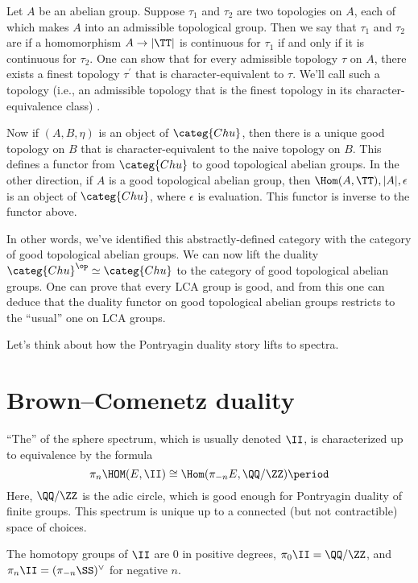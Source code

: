 \documentclass[leqno]{article}
\begin{document}
Let \(A\) be an abelian group.
Suppose \(\tau_{1}\) and \(\tau_{2}\) are two topologies on \(A\),
each of which makes \(A\) into an admissible topological group.
Then we say that \(\tau_{1}\) and \(\tau_{2}\) are  if
a homomorphism \(A \to |\TT|\) is continuous for \(\tau_{1}\)
if and only if it is continuous for \(\tau_{2}\).
One can show that for every admissible topology \(\tau\) on \(A\),
there exists a finest topology \(\tau^{'}\)
that is character-equivalent to \(\tau\).
We'll call such a topology (i.e., an admissible topology that
is the finest topology in its character-equivalence class)
.

Now if \((A,B,\eta)\) is an object of \(\categ{Chu}\), then
there is a unique good topology on \(B\) that is character-equivalent
to the naive topology on \(B\).
This defines a functor from \(\categ{Chu}\)
to good topological abelian groups.
In the other direction, if \(A\) is a good topological abelian group,
then \(\Hom(A,\TT),|A|,\epsilon\) is an object of \(\categ{Chu}\),
where \(\epsilon\) is evaluation.
This functor is inverse to the functor above.

In other words, we've identified this abstractly-defined category
with the category of good topological abelian groups.
We can now lift the duality \(\categ{Chu}^{\op} \simeq \categ{Chu}\)
to the category of good topological abelian groups.
One can prove that every LCA group is good, and
from this one can deduce that the duality functor
on good topological abelian groups restricts
to the \enquote{usual} one on LCA groups.

Let's think about how the Pontryagin duality story lifts to spectra.

\section{Brown--Comenetz duality}%
\label{browncomenetz}

\enquote{The}  of the sphere spectrum,
which is usually denoted \(\II\), is characterized up to equivalence
by the formula
\begin{equation*}
    \pi_n \HOM(E, \II) \cong \Hom(\pi_{-n} E, \QQ/\ZZ) \period
\end{equation*}
Here, \(\QQ/\ZZ\) is the adic circle,
which is good enough for Pontryagin duality of finite groups.
This spectrum is unique up to a connected
(but not contractible) space of choices.

The homotopy groups of \(\II\) are \(0\) in positive degrees,
\(\pi_{0}\II = \QQ/\ZZ\), and
\(\pi_{n}\II = (\pi_{-n}\SS)^{\vee}\) for negative \(n\).
\end{document}
